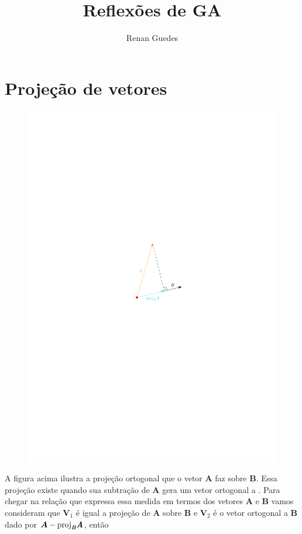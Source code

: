 \documentclass[a4paper, 12pt, brazilian]{article}
\title{Reflexões de GA}
\author{Renan Guedes}
\newcommand{\bfit}[1]{\textit{\textbf{#1}}}
\newcommand{\proj}[2]{\textrm{proj}_{\bfit{#1}}\bfit{#2}}
\begin{document}
	\maketitle
	\section{Projeção de vetores}
	\begin{figure}[H]
		\centering
		\includegraphics[scale=1.1]{images/proj}
	\end{figure}
	A figura acima ilustra a projeção ortogonal que o vetor $\bm{A}$ faz sobre $\bm{B}$. Essa projeção existe quando sua subtração de $\bm{A}$ gera um vetor ortogonal a . Para chegar na relação que expressa essa medida em termos dos vetores $\bm{A}$ e $\bm{B}$ vamos consideram que $\bm{V}_{1}$ é igual a projeção de $\bm{A}$ sobre $\bm{B}$ e $\bm{V}_{2}$ é o vetor ortogonal a $\bm{B}$ dado por $\bm{A}-\proj{B}{A}$, então
\end{document}

